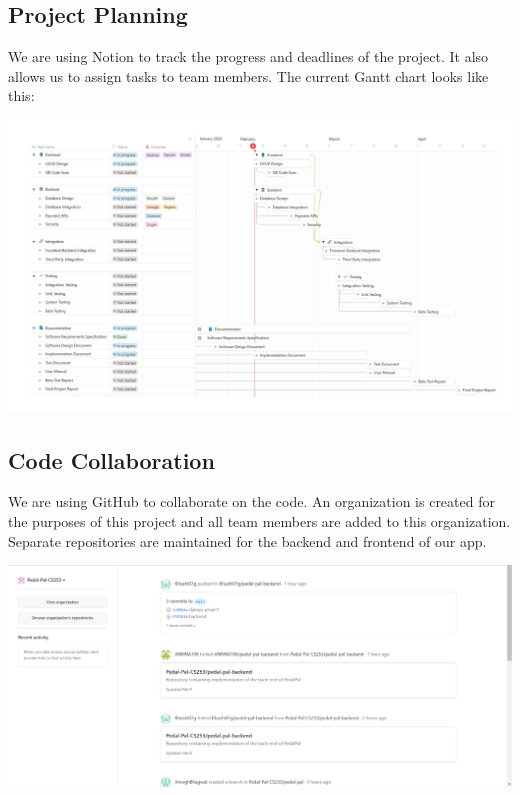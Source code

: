 \documentclass[11pt]{article}
\begin{document}
\newpage
\section{}
\subsection{Project Planning}
We are using Notion to track the progress and deadlines of the project. It also allows us to assign tasks to team members. The current Gantt chart looks like this:
\begin{center}
  \includegraphics[scale=0.1]{project-plan-images/notion.png}
\end{center}

\subsection{Code Collaboration}
We are using GitHub to collaborate on the code. An organization is created for the purposes of this project and all team members are added to this organization. Separate repositories are maintained for the backend and frontend of our app. 
\begin{center}
  \includegraphics[scale=0.3]{project-plan-images/github.png}
\end{center}
\end{document}
